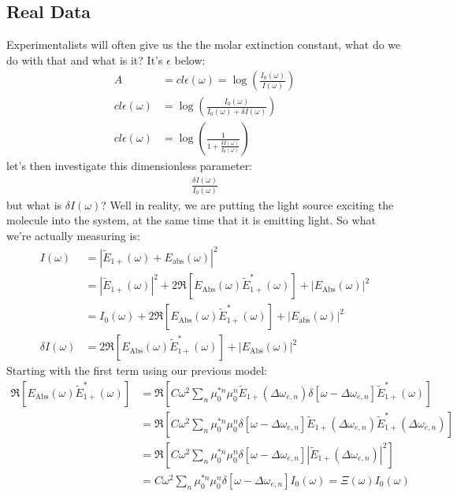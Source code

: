 \subsection{Real Data}
Experimentalists will often give us the  the molar extinction constant, what do we do with that and what is it?  It's $\epsilon$ below:
\begin{align*}
	A &= c l \epsilon(\omega) = \log \left( \frac{I_0(\omega)}{I(\omega)} \right)\\
	c l \epsilon(\omega) &= \log \left( \frac{I_0(\omega)}{I_0(\omega) + \delta I(\omega)} \right)\\
	c l \epsilon(\omega) &= \log \left( \frac{1}{1 + \frac{\delta I(\omega)}{I_0(\omega)}} \right)
\end{align*}
let's then investigate this dimensionless parameter:
\begin{align*}
	\frac{\delta I(\omega)}{I_0(\omega)}
\end{align*}
but what is $\delta I (\omega)$?  Well in reality, we are putting the light source exciting the molecule into the system, at the same time that it is emitting light.  So what we're actually measuring is:
\begin{align*}
		I (\omega) &=  \left|  \tilde{E}_{1+}(\omega) +  E_{\text{abs}}(\omega) \right|^2 \\
		&= \left|  \tilde{E}_{1+}(\omega) \right|^2 + 2 \Re \left[ E_{\text{Abs}}(\omega) \tilde{E}^*_{1+}(\omega)  \right] +  \left|   E_{\text{Abs}}(\omega) \right|^2\\
		&= I_{0}(\omega) + 2 \Re \left[ E_{\text{Abs}}(\omega) \tilde{E}^*_{1+}(\omega)  \right] +  \left|   E_{\text{abs}}(\omega) \right|^2 \\
		\delta I (\omega) &= 2 \Re \left[ E_{\text{Abs}}(\omega) \tilde{E}^*_{1+}(\omega)  \right] +  \left|   E_{\text{Abs}}(\omega) \right|^2
\end{align*}
Starting with the first term using our previous model:
\begin{align*}
	\Re \left[ E_{\text{Abs}}(\omega) \tilde{E}^*_{1+}(\omega)  \right] &= \Re \left[ C \omega^2 \sum_n  \mu_{0}^{*n}  \mu_{0}^{n} \tilde{E}_{1+} (\Delta \omega_{e, n}) \delta \left[ \omega - \Delta \omega_{e, n} \right] \tilde{E}^*_{1+}(\omega)  \right] \\
	&= \Re \left[ C \omega^2 \sum_n  \mu_{0}^{*n}  \mu_{0}^{n} \delta \left[ \omega - \Delta \omega_{e, n} \right] \tilde{E}_{1+} (\Delta \omega_{e, n})  \tilde{E}^*_{1+}(\Delta \omega_{e, n})  \right]\\
	&= \Re \left[ C \omega^2 \sum_n  \mu_{0}^{*n}  \mu_{0}^{n} \delta \left[ \omega - \Delta \omega_{e, n} \right] \left| \tilde{E}_{1+} (\Delta \omega_{e, n}) \right|^2  \right] \\
	&= C \omega^2 \sum_n  \mu_{0}^{*n}  \mu_{0}^{n} \delta \left[ \omega - \Delta \omega_{e, n} \right] I_0 (\omega) = \Xi (\omega) I_0 (\omega)
\end{align*}
